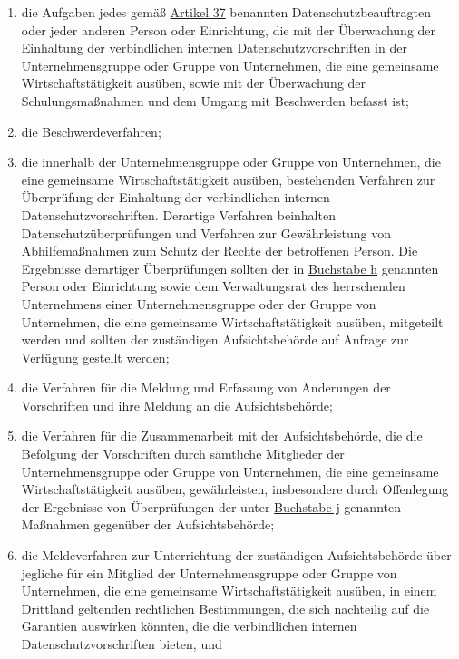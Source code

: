 \begin{enumerate}
\begin{enumerate}
    \item die Aufgaben jedes gemäß \hyperref[ch:37]{Artikel 37} benannten Datenschutzbeauftragten oder jeder anderen
     Person oder Einrichtung, die mit der Überwachung der Einhaltung der verbindlichen internen Datenschutzvorschriften
     in der Unternehmensgruppe oder Gruppe von Unternehmen, die eine gemeinsame Wirtschaftstätigkeit ausüben, sowie mit
     der Überwachung der Schulungsmaßnahmen und dem Umgang mit Beschwerden befasst ist;
    \label{itm:47-2h}

    \item die Beschwerdeverfahren;
    \label{itm:47-2i}

    \item die innerhalb der Unternehmensgruppe oder Gruppe von Unternehmen, die eine gemeinsame Wirtschaftstätigkeit
     ausüben, bestehenden Verfahren zur Überprüfung der Einhaltung der verbindlichen internen Datenschutzvorschriften.
     Derartige Verfahren beinhalten Datenschutzüberprüfungen und Verfahren zur Gewährleistung von Abhilfemaßnahmen zum
     Schutz der Rechte der betroffenen Person. Die Ergebnisse derartiger Überprüfungen sollten der in \hyperref
     [itm:47-2h]{Buchstabe h} genannten Person oder Einrichtung sowie dem Verwaltungsrat des herrschenden Unternehmens
     einer Unternehmensgruppe oder der Gruppe von Unternehmen, die eine gemeinsame Wirtschaftstätigkeit ausüben,
     mitgeteilt werden und sollten der zuständigen Aufsichtsbehörde auf Anfrage zur Verfügung gestellt werden;
    \label{itm:47-2j}

    \item die Verfahren für die Meldung und Erfassung von Änderungen der Vorschriften und ihre Meldung an die
     Aufsichtsbehörde;
    \label{itm:47-2k}

    \item die Verfahren für die Zusammenarbeit mit der Aufsichtsbehörde, die die Befolgung der Vorschriften durch
     sämtliche Mitglieder der Unternehmensgruppe oder Gruppe von Unternehmen, die eine gemeinsame Wirtschaftstätigkeit
     ausüben, gewährleisten, insbesondere durch Offenlegung der Ergebnisse von Überprüfungen der unter \hyperref
     [itm:47-2j]{Buchstabe j} genannten Maßnahmen gegenüber der Aufsichtsbehörde;
    \label{itm:47-2l}

    \item die Meldeverfahren zur Unterrichtung der zuständigen Aufsichtsbehörde über jegliche für ein Mitglied der
     Unternehmensgruppe oder Gruppe von Unternehmen, die eine gemeinsame Wirtschaftstätigkeit ausüben, in einem
     Drittland geltenden rechtlichen Bestimmungen, die sich nachteilig auf die Garantien auswirken könnten, die die
     verbindlichen internen Datenschutzvorschriften bieten, und
    \label{itm:47-2m}


\end{enumerate}
\end{enumerate}
